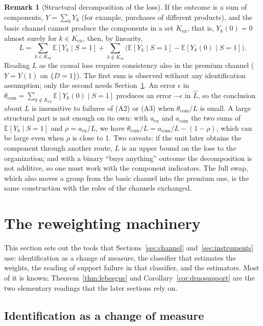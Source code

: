 \documentclass[twoside,11pt]{article}
\newcommand{\E}{\mathbb{E}}
\theoremstyle{plain}
\theoremstyle{definition}
\newtheorem{remark}{Remark}
\begin{document}
\begin{remark}[Structural decomposition of the loss]\label{rem:decomposition}
If the outcome is a sum of components, $Y=\sum_kY_k$ (for example, purchases of different products), and the basic channel cannot produce the components in a set $K_{\mathrm{ex}}$, that is, $Y_k(0)=0$ almost surely for $k\in K_{\mathrm{ex}}$, then, by linearity,
\[
L=\sum_{k\in K_{\mathrm{ex}}}\E[Y_k\mid S=1]+\sum_{k\notin K_{\mathrm{ex}}}\bigl(\E[Y_k\mid S=1]-\E[Y_k(0)\mid S=1]\bigr).
\]
Reading $L$ as the causal loss requires consistency also in the premium channel ($Y=Y(1)$ on $\{D=1\}$). The first sum is observed without any identification assumption; only the second needs Section~\ref{sec:identification}. An error $\epsilon$ in $\theta_{\mathrm{com}}=\sum_{k\notin K_{\mathrm{ex}}}\E[Y_k(0)\mid S=1]$ produces an error $-\epsilon$ in $\hat L$, so the conclusion about $L$ is insensitive to failures of (A2) or (A3) when $\theta_{\mathrm{com}}/L$ is small. A large structural part is not enough on its own: with $a_{\mathrm{ex}}$ and $a_{\mathrm{com}}$ the two sums of $\E[Y_k\mid S=1]$ and $\rho=a_{\mathrm{ex}}/L$, we have $\theta_{\mathrm{com}}/L=a_{\mathrm{com}}/L-(1-\rho)$, which can be large even when $\rho$ is close to 1. Two caveats: if the unit later obtains the component through another route, $L$ is an upper bound on the loss to the organization; and with a binary ``buys anything'' outcome the decomposition is not additive, so one must work with the component indicators. The full swap, which also moves a group from the basic channel into the premium one, is the same construction with the roles of the channels exchanged.
\end{remark}
\section{The reweighting machinery}\label{sec:identification}

This section sets out the tools that Sections~\ref{sec:channel} and~\ref{sec:instruments} use: identification as a change of measure, the classifier that estimates the weights, the reading of support failure in that classifier, and the estimators. Most of it is known; Theorem~\ref{thm:lebesgue} and Corollary~\ref{cor:drnosupport} are the two elementary readings that the later sections rely on.

\subsection{Identification as a change of measure}
\end{document}
